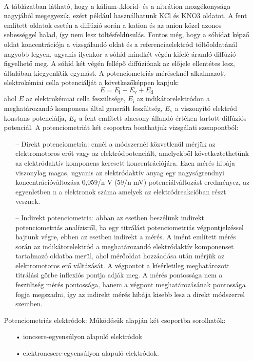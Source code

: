 \\A táblázatban látható, hogy a kálium-,klorid- és a nitrátion mozgékonysága nagyjából megegyezik, ezért például használhatunk KCl és KNO3 oldatot.
A fent említett oldatok esetén a diffúzió során a kation és az anion közel azonos sebességgel halad, így nem lesz töltésfeldúsulás. Fontos még, hogy a sóhídat képző oldat koncentrációja a vizsgálandó oldat és a referenciaelektród töltőoldatánál nagyobb legyen, ugyanis ilyenkor a sóhíd mindkét végén kifelé áramló diffúzió figyelhető meg. A sóhíd két végén fellépő diffúziónak az előjele ellentétes lesz, általában kiegyenlítik egymást. A potenciometriás méréseknél alkalmazott elektrokémiai cella potenciálját a következőképpen kapjuk:
\begin{equation}
E= E_\text{i} - E_\text{v} + E_\text{d}
\end{equation}
ahol $E$ az elektrokémiai cella feszültsége, $E_\text{i}$ az indikátorelektródon a meghatározandó komponens által generált feszültség, $E_\text{v}$ a viszonyító elektród konstans potenciálja, $E_\text{d}$ a fent említett alacsony állandó értéken tartott diffúziós potenciál.
A potenciometriát két csoportra bonthatjuk vizsgálati szempontból: 
\begin{itemize}
\item[--]Direkt potenciometria: ennél a módszernél közvetlenül mérjük az elektromotoros erőt vagy az elektródpotenciált, amelyekből következtethetünk az elektródaktív komponens keresett koncentrációjára. Ezen mérés hibája viszonylag magas, ugyanis az elektródaktív anyag egy nagyságrendnyi koncentrációváltozása 0,059/n V (59/n mV) potenciálváltozást eredményez, az egyenletben n a elektronok száma amelyek az elektródreakcióban részt vesznek.
\item[--]Indirekt potenciometria: abban az esetben beszélünk indirekt potenciometriás analízisről, ha egy titrálást potenciometriás végpontjelzéssel hajtunk végre, ebben az esetben indirekt a mérés. A imént említett mérés során az indikátorelektród a meghatározandó elektródaktív komponenset tartalmazó oldatba merül, ahol mérőoldat hozzáadása után mérjük az elektromotoros erő váltázását. A végpontot a kísérletileg meghatározott titrálási görbe inflexiós pontja adják meg. A mérés pontossága nem a feszültség mérés  pontossága, hanem a végpont meghatározásának pontossága fogja megszadni, így az indirekt mérés hibája kisebb lesz a direkt módszerrel szemben.
\end{itemize}
Potenciometriás elektródok:
Működésük alapján két csoportba sorolhatók:
\begin{itemize}
\item[•]ioncsere-egyensúlyon alapuló elektródok
\item[•]elektroncsere-egyensúlyon alapuló elektródok.
\end{itemize} 

